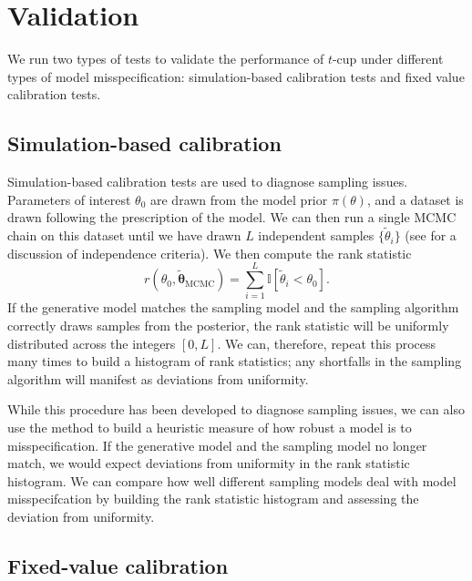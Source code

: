 \documentclass[fleqn,usenatbib]{mnras}
\begin{document}

\section{Validation}
\label{sec:methods}

We run two types of tests to validate the performance of $t$-cup under different
types of model misspecification: simulation-based calibration tests
\citep{Cook:2006, Talts:2018} and fixed value calibration tests.

\subsection{Simulation-based calibration}
\label{sec:methods.sbc}

Simulation-based calibration tests \citep{Cook:2006, Talts:2018} are used to
diagnose sampling issues. Parameters of interest $\theta_0$ are drawn from the
model prior $\pi(\theta)$, and a dataset is drawn following the prescription of
the model. We can then run a single MCMC chain on this dataset until we have
drawn $L$ independent samples $\{\tilde{\theta}_{i}\}$ (see \citep{Talts:2018}
for a discussion of independence criteria). We then compute the rank statistic
\begin{equation}
    r(\theta_0, \tilde{\boldsymbol{\theta}}_{\text{MCMC}})
        = \sum_{i = 1}^{L} \mathbb I [\tilde{\theta}_i < \theta_0].
\end{equation}
If the generative model matches the sampling model and the sampling algorithm
correctly draws samples from the posterior, the rank statistic will be uniformly
distributed across the integers $[0, L]$. We can, therefore, repeat this process
many times to build a histogram of rank statistics; any shortfalls in the
sampling algorithm will manifest as deviations from uniformity.

While this procedure has been developed to diagnose sampling issues, we can also
use the method to build a heuristic measure of how robust a model is to
misspecification. If the generative model and the sampling model no longer
match, we would expect deviations from uniformity in the rank statistic
histogram. We can compare how well different sampling models deal with model
misspecifcation by building the rank statistic histogram and assessing the
deviation from uniformity.

\subsection{Fixed-value calibration}
\label{sec:methods.fixed}
\end{document}
